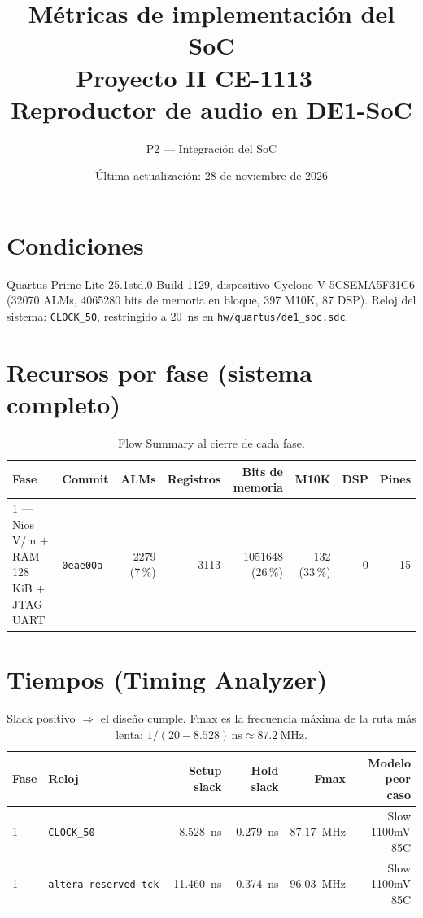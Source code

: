 \documentclass[11pt]{article}
\title{Métricas de implementación del SoC\\\large Proyecto II CE-1113 — Reproductor de audio en DE1-SoC}
\author{P2 — Integración del SoC}
\date{Última actualización: 28 de noviembre de 2026}
\begin{document}
\maketitle

\section*{Condiciones}
Quartus Prime Lite 25.1std.0 Build 1129, dispositivo Cyclone V 5CSEMA5F31C6
(\num{32070} ALMs, \num{4065280} bits de memoria en bloque, 397 M10K, 87 DSP).
Reloj del sistema: \texttt{CLOCK\_50}, restringido a \SI{20}{\nano\second} en
\texttt{hw/quartus/de1\_soc.sdc}.

\section{Recursos por fase (sistema completo)}

\begin{table}[h]
\centering
\small
\begin{tabular}{@{}l l r r r r r r@{}}
\toprule
Fase & Commit & ALMs & Registros & Bits de memoria & M10K & DSP & Pines \\
\midrule
1 — Nios V/m + RAM 128 KiB + JTAG UART & \texttt{0eae00a}
  & \num{2279} (7\,\%) & \num{3113} & \num{1051648} (26\,\%) & 132 (33\,\%) & 0 & 15 \\
\bottomrule
\end{tabular}
\caption{Flow Summary al cierre de cada fase.}
\end{table}

\section{Tiempos (Timing Analyzer)}

\begin{table}[h]
\centering
\small
\begin{tabular}{@{}l l r r r r@{}}
\toprule
Fase & Reloj & Setup slack & Hold slack & Fmax & Modelo peor caso \\
\midrule
1 & \texttt{CLOCK\_50}            & \SI{8.528}{\nano\second}  & \SI{0.279}{\nano\second} & \SI{87.17}{\mega\hertz} & Slow 1100mV 85C \\
1 & \texttt{altera\_reserved\_tck} & \SI{11.460}{\nano\second} & \SI{0.374}{\nano\second} & \SI{96.03}{\mega\hertz} & Slow 1100mV 85C \\
\bottomrule
\end{tabular}
\caption{Slack positivo $\Rightarrow$ el diseño cumple. Fmax es la frecuencia
máxima de la ruta más lenta: $1/(20 - 8.528)\,\text{ns} \approx \SI{87.2}{\mega\hertz}$.}
\end{table}
\end{document}
